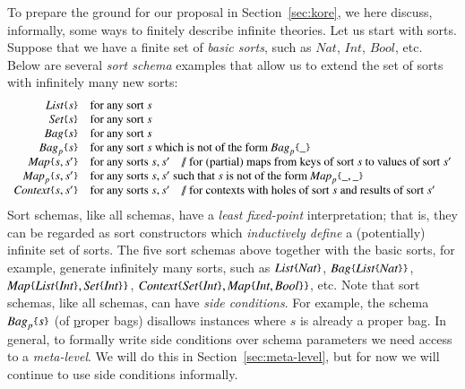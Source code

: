 \documentclass[UTF8,11pt]{article}
\theoremstyle{plain}
\theoremstyle{definition}
\theoremstyle{remark}
\newcommand{\Nat}{\textit{Nat}}
\newcommand{\Int}{\textit{Int}}
\newcommand{\Bool}{\textit{Bool}}
\newcommand{\List}{\textit{List}}
\newcommand{\Bag}{\textit{Bag}}
\newcommand{\Set}{\textit{Set}}
\newcommand{\Map}{\textit{Map}}
\newcommand{\Context}{\textit{Context}}
\newcommand{\parametric}[2]{{#1}\raisebox{.2ex}{\texttt{\footnotesize{\{}}}#2\raisebox{.2ex}{\texttt{\footnotesize{\}}}}}
\newcommand{\doubleslash}{/\!/{ }}
\begin{document}
To prepare the ground for our proposal in Section~\ref{sec:kore},
we here discuss, informally, some ways to finitely describe infinite theories.
Let us start with sorts.
Suppose that we have a finite set of \emph{basic sorts}, such as
$\Nat$, $\Int$, $\Bool$, etc.
Below are several \emph{sort schema} examples that allow us to extend the set
of sorts with infinitely many new sorts:
$$
\begin{array}{rl}
\parametric{\List}{s} &
\textrm{for any sort $s$} \\
\parametric{\Set}{s} &
\textrm{for any sort $s$} \\
\parametric{\Bag}{s} &
\textrm{for any sort $s$} \\
\parametric{\Bag_p}{s} &
\textrm{for any sort $s$ which is not of the form $\parametric{\Bag_p}{\_}$} \\
\parametric{\Map}{s,s'} &
\textrm{for any sorts $s,s'$ \ \ \ \doubleslash for (partial) maps from keys of
sort
$s$ to values of sort $s'$} \\
\parametric{\Map_p}{s,s'} &
\textrm{for any sorts $s,s'$ such that $s$ is not of the form $\parametric{\Map_p}{\_,\_}$}
\\
\parametric{\Context}{s,s'} &
\textrm{for any sorts $s,s'$ \ \ \ \doubleslash for contexts with holes of sort
$s$ and results of sort $s'$}
\end{array}
$$
Sort schemas, like all schemas, have a \emph{least fixed-point}
interpretation;
that is, they can be regarded as sort constructors which
{\em inductively define} a (potentially) infinite set of sorts.
The five sort schemas above together with the basic sorts, for example,
generate infinitely many sorts, such as
$\parametric{\List}{\Nat}$,
$\parametric{\Bag}{\parametric{\List}{\Nat}}$,
$\parametric{\Map}{\parametric{\List}{\Int},\parametric{\Set}{\Int}}$,
$\parametric{\Context}{\parametric{\Set}{\Int},\parametric{\Map}{\Int,\Bool}}$,
etc.
Note that sort schemas, like all schemas, can have \emph{side conditions}.
For example, the schema $\parametric{\Bag_p}{s}$ (of \underline{p}roper bags)
disallows instances where $s$ is already a proper bag.
In general, to formally write side conditions over schema parameters we need
access to a \emph{meta-level}.
We will do this in Section~\ref{sec:meta-level}, but for now we will continue
to use side conditions informally.
\end{document}
